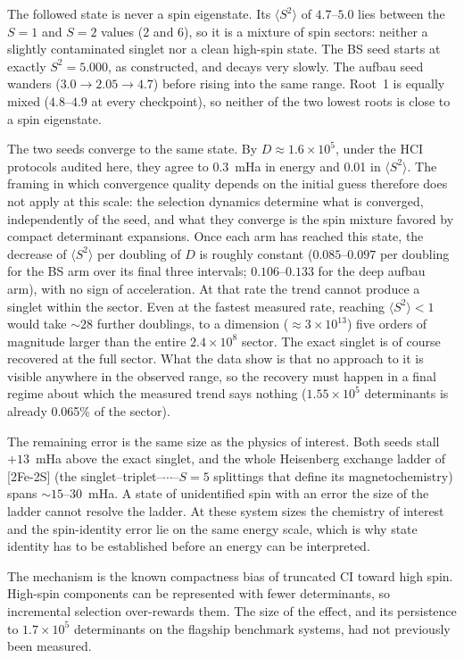 \documentclass[11pt]{article}
\newcommand{\ssq}{\ensuremath{\langle S^2\rangle}}
\begin{document}
The followed state is never a spin eigenstate. Its \ssq{} of $4.7$--$5.0$ lies between the $S=1$ and $S=2$ values (2 and 6), so it is a mixture of spin sectors: neither a slightly contaminated singlet nor a clean high-spin state. The BS seed starts at exactly $S^2=5.000$, as constructed, and decays very slowly. The aufbau seed wanders ($3.0 \to 2.05 \to 4.7$) before rising into the same range. Root~1 is equally mixed ($4.8$--$4.9$ at every checkpoint), so neither of the two lowest roots is close to a spin eigenstate.

The two seeds converge to the same state. By $D\approx1.6\times10^5$, under the HCI protocols audited here, they agree to 0.3~mHa in energy and 0.01 in \ssq. The framing in which convergence quality depends on the initial guess therefore does not apply at this scale: the selection dynamics determine what is converged, independently of the seed, and what they converge is the spin mixture favored by compact determinant expansions. Once each arm has reached this state, the decrease of \ssq{} per doubling of $D$ is roughly constant ($0.085$--$0.097$ per doubling for the BS arm over its final three intervals; $0.106$--$0.133$ for the deep aufbau arm), with no sign of acceleration. At that rate the trend cannot produce a singlet within the sector. Even at the fastest measured rate, reaching $\ssq < 1$ would take ${\sim}28$ further doublings, to a dimension ($\approx 3\times10^{13}$) five orders of magnitude larger than the entire $2.4\times10^8$ sector. The exact singlet is of course recovered at the full sector. What the data show is that no approach to it is visible anywhere in the observed range, so the recovery must happen in a final regime about which the measured trend says nothing ($1.55\times10^5$ determinants is already 0.065\% of the sector).

The remaining error is the same size as the physics of interest. Both seeds stall $+13$~mHa above the exact singlet, and the whole Heisenberg exchange ladder of [2Fe-2S] (the singlet--triplet--$\cdots$--$S=5$ splittings that define its magnetochemistry) spans ${\sim}15$--$30$~mHa. A state of unidentified spin with an error the size of the ladder cannot resolve the ladder. At these system sizes the chemistry of interest and the spin-identity error lie on the same energy scale, which is why state identity has to be established before an energy can be interpreted.

The mechanism is the known compactness bias of truncated CI toward high spin. High-spin components can be represented with fewer determinants, so incremental selection over-rewards them. The size of the effect, and its persistence to $1.7\times10^5$ determinants on the flagship benchmark systems, had not previously been measured.
\end{document}
